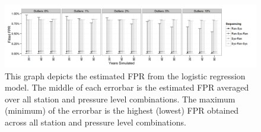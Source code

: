 \documentclass[12pt]{article}
\begin{document}
\begin{figure}[h!]
	\centering
	\includegraphics[width=\textwidth]{FPR_Order_Plot_BW}
	\caption{This graph depicts the estimated FPR from the logistic regression model.  The middle of each errorbar is the estimated FPR averaged over all station and pressure level combinations.  The maximum (minimum) of the errorbar is the highest (lowest) FPR obtained across all station and pressure level combinations.}
	\label{fig:fitFPR}
\end{figure}
\end{document}
